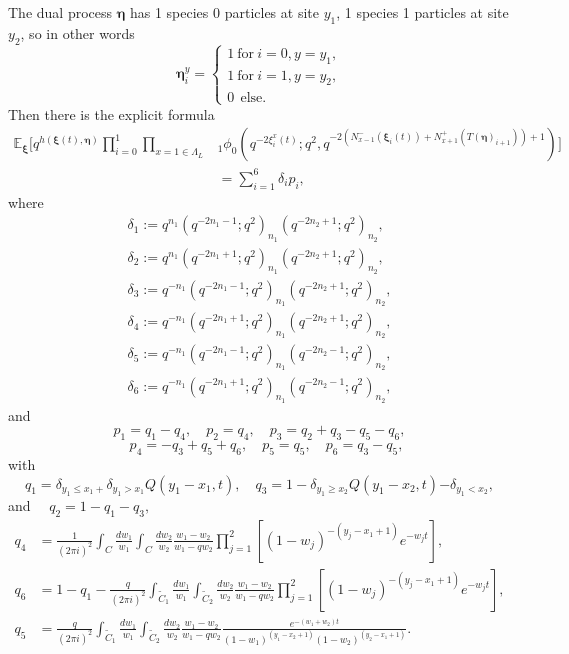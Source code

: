 \documentclass{ximera}
\begin{document}
\begin{theorem}
The dual process $\boldsymbol\eta$ has 1 species 0 particles at site
$y_1$, 1 species 1 particles at site $y_2$, so in other words
$$
\boldsymbol\eta_i^y 
= 
\begin{cases}
1 \ \text{for} \ i=0,y=y_1,\\
1 \ \text{for} \ i=1,y=y_2,\\
0 \ \  \text{else}.
\end{cases}
$$  
Then there is the explicit formula 
\begin{align*}
\mathbb{E}_{\boldsymbol{\xi}} \Big[ q^{h(\boldsymbol\xi (t),\boldsymbol\eta)} \prod_{i=0}^{1}\prod_{x=1 \in \Lambda_L} & {}_1\phi_0\left(q^{-2\xi_i^x (t)};q^2,q^{-2\left(N_{x-1}^-(\boldsymbol\xi_i (t))+N_{x+1}^+(T(\boldsymbol\eta)_{i+1})\right)+1}\right) \Big]
\\ &  = \sum_{i=1}^6{\delta_ip_i},
\end{align*}
where
\begin{align*}   
   \delta_1:= q^{n_1}\left(q^{-2n_1-1};q^2\right)_{n_1} \left(q^{-2n_2+1};q^2\right)_{n_2}    ,\\
    \delta_2:=     q^{n_1}\left(q^{-2n_1+1};q^2\right)_{n_1} \left(q^{-2n_2+1};q^2\right)_{n_2}  ,\\
     \delta_3:=   q^{-n_1}\left(q^{-2n_1-1};q^2\right)_{n_1} \left(q^{-2n_2+1};q^2\right)_{n_2}    ,\\
      \delta_4:=    q^{-n_1}\left(q^{-2n_1+1};q^2\right)_{n_1} \left(q^{-2n_2+1};q^2\right)_{n_2}  ,\\
   \delta_5:=   q^{-n_1}\left(q^{-2n_1-1};q^2\right)_{n_1} \left(q^{-2n_2-1};q^2\right)_{n_2}  ,\\
    \delta_6:=     q^{-n_1}\left(q^{-2n_1+1};q^2\right)_{n_1} \left(q^{-2n_2-1};q^2\right)_{n_2}  ,
  \end{align*}
  and
  $$
p_1 = q_1-q_4, \quad p_2=q_4, \quad p_3 = q_2+q_3-q_5-q_6, 
$$
$$\quad p_4 = -q_3 + q_5+q_6, \quad p_5=q_5, \quad p_6=q_3-q_5,$$
with
$$
q_1 ={\delta_{y_1\le x_1+}\delta_{y_1> x_1} }Q(y_1-x_1,t) , \quad q_3 = 1 - {\delta_{y_1\ge x_2}Q(y_1-x_2,t)}{-\delta_{y_1<x_2}} , 
$$
and $\quad q_2 = 1- q_1-q_3,$
\begin{align*}
q_4&=\frac{ 1}{(2\pi i)^2}\int_{C} \frac{d w_{1}}{w_{1}}  \int_{C} \frac{d w_{2}}{w_{2}} \frac{w_1-w_2}{w_1-qw_2} \prod_{j=1}^{2}\left[(1-w_j)^{-(y_j-x_1+1)}e^{-w_{j} t}\right] ,\\
q_6 &= 1-q_1 -\frac{ q}{(2\pi i)^2}\int_{\tilde{C}_{1}} \frac{d w_{1}}{w_{1}}  \int_{\tilde{C}_{2}} \frac{d w_{2}}{w_{2}} \frac{w_1-w_2}{w_1-qw_2}\prod_{j=1}^{2}\left[(1-w_j)^{-(y_j-x_1+1)}e^{-w_{j} t}\right],\\
q_5&= \frac{ q}{(2\pi i)^2}\int_{\tilde{C}_{1}}  \frac{dw_1}{w_1}  \int_{\tilde{C}_{2}}  \frac{dw_2}{w_2} \frac{w_1-w_2}{w_1-qw_2}\frac{e^{-(w_1+w_2)t  } }{(1-w_1)^{({y_1-x_2}+1)}(1-w_2)^{({y_2-x_1}+1)}}  . \\
\end{align*}
\end{theorem}
\end{document}
